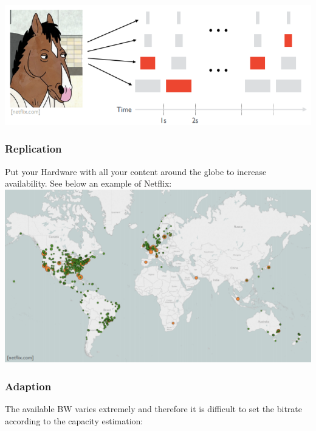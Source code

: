 \documentclass[a4paper, fontsize=8pt, landscape, DIV=1]{scrartcl}
\begin{document}
\begin{multicols*}{4}
		\includegraphics[width=\columnwidth]{images/Application_Layer/encoding_chunks.png}
		
		\subsubsection{Replication}
		Put your Hardware with all your content around the globe to increase
		availability. See below an example of Netflix:\\ 
		
		\includegraphics[width=\columnwidth]{images/Application_Layer/netflix_recreation.png}
		
		\subsubsection{Adaption}
		The available BW varies extremely and therefore it is difficult to set the
		bitrate according to the capacity estimation:\\
		

\end{multicols*}
\end{document}
